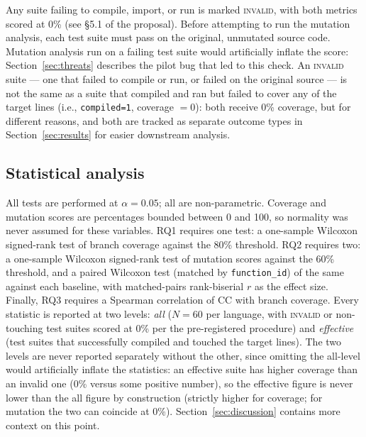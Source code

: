 Any suite failing to compile, import, or run is marked \textsc{invalid}, with both metrics
scored at 0\% (see \S5.1 of the proposal). Before attempting to run the mutation analysis,
each test suite must pass on the original, unmutated source code. Mutation analysis run on
a failing test suite would artificially inflate the score: Section~\ref{sec:threats}
describes the pilot bug that led to this check. An \textsc{invalid} suite --- one that
failed to compile or run, or failed on the original source --- is not the same as a suite
that compiled and ran but failed to cover any of the target lines (i.e.,
\texttt{compiled=1}, coverage $=0$): both receive 0\% coverage, but for different reasons,
and both are tracked as separate outcome types in Section~\ref{sec:results} for easier
downstream analysis.

\subsection{Statistical analysis}
All tests are performed at $\alpha = 0.05$; all are non-parametric. Coverage and mutation
scores are percentages bounded between 0 and 100, so normality was never assumed for these
variables. RQ1 requires one test: a one-sample Wilcoxon signed-rank test of branch
coverage against the 80\% threshold. RQ2 requires two: a one-sample Wilcoxon signed-rank
test of mutation scores against the 60\% threshold, and a paired Wilcoxon test (matched by
\texttt{function\_id}) of the same against each baseline, with matched-pairs rank-biserial
$r$ as the effect size. Finally, RQ3 requires a Spearman correlation of CC with branch
coverage. Every statistic is reported at two levels: \emph{all} ($N = 60$ per
language, with \textsc{invalid} or non-touching test suites scored at 0\% per the
pre-registered procedure) and \emph{effective} (test suites that successfully compiled and
touched the target lines). The two levels are never reported separately without the other,
since omitting the all-level would artificially inflate the statistics: an effective suite
has higher coverage than an invalid one (0\% versus some positive number), so the
effective figure is never lower than the all figure by construction (strictly higher for
coverage; for mutation the two can coincide at 0\%).
Section~\ref{sec:discussion} contains more context on this point.
